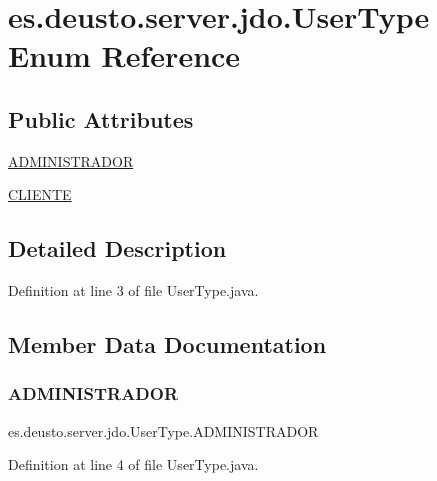 \hypertarget{enumes_1_1deusto_1_1server_1_1jdo_1_1_user_type}{}\section{es.\+deusto.\+server.\+jdo.\+User\+Type Enum Reference}
\label{enumes_1_1deusto_1_1server_1_1jdo_1_1_user_type}
\subsection*{Public Attributes}
\begin{DoxyCompactItemize}
\item 
\mbox{\hyperlink{enumes_1_1deusto_1_1server_1_1jdo_1_1_user_type_a6fd066c8194a54c1f832f036029ef8d3}{A\+D\+M\+I\+N\+I\+S\+T\+R\+A\+D\+OR}}
\item 
\mbox{\hyperlink{enumes_1_1deusto_1_1server_1_1jdo_1_1_user_type_ac2d017013d2225cf8aed1045bd2d0870}{C\+L\+I\+E\+N\+TE}}
\end{DoxyCompactItemize}


\subsection{Detailed Description}


Definition at line 3 of file User\+Type.\+java.



\subsection{Member Data Documentation}
\mbox{\label{enumes_1_1deusto_1_1server_1_1jdo_1_1_user_type_a6fd066c8194a54c1f832f036029ef8d3}} 
\subsubsection{\texorpdfstring{ADMINISTRADOR}{ADMINISTRADOR}}
{\footnotesize\ttfamily es.\+deusto.\+server.\+jdo.\+User\+Type.\+A\+D\+M\+I\+N\+I\+S\+T\+R\+A\+D\+OR}



Definition at line 4 of file User\+Type.\+java.

\mbox{\label{enumes_1_1deusto_1_1server_1_1jdo_1_1_user_type_ac2d017013d2225cf8aed1045bd2d0870}} 
